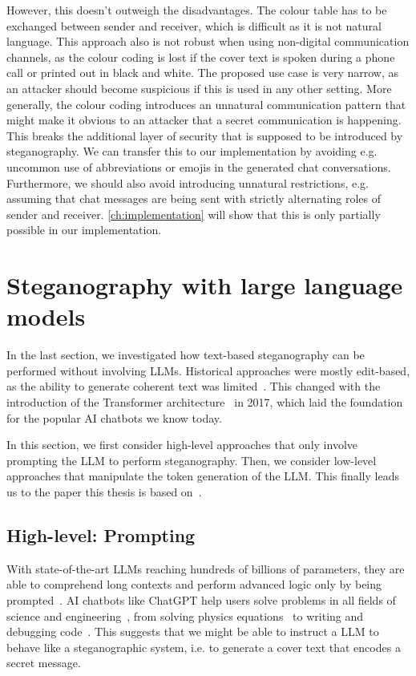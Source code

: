 However, this doesn't outweigh the disadvantages. The colour table has to be exchanged between sender and receiver, which is difficult as it is not natural language. This approach also is not robust when using non-digital communication channels, as the colour coding is lost if the cover text is spoken during a phone call or printed out in black and white. The proposed use case is very narrow, as an attacker should become suspicious if this is used in any other setting. More generally, the colour coding introduces an unnatural communication pattern that might make it obvious to an attacker that a secret communication is happening. This breaks the additional layer of security that is supposed to be introduced by steganography. We can transfer this to our implementation by avoiding e.g. uncommon use of abbreviations or emojis in the generated chat conversations. Furthermore, we should also avoid introducing unnatural restrictions, e.g. assuming that chat messages are being sent with strictly alternating roles of sender and receiver. \cref{ch:implementation} will show that this is only partially possible in our implementation.

\section{Steganography with large language models}
\label{sec:steganographyWithLLMs}
In the last section, we investigated how text-based steganography can be performed without involving \glspl{LLM}. Historical approaches were mostly edit-based, as the ability to generate coherent text was limited~\cite{zieglerNeuralLinguisticSteganography2019}. This changed with the introduction of the Transformer architecture~\cite{vaswaniAttentionAllYou2023} in 2017, which laid the foundation for the popular \gls{AI} chatbots we know today.

In this section, we first consider high-level approaches that only involve prompting the \gls{LLM} to perform steganography. Then, we consider low-level approaches that manipulate the token generation of the \gls{LLM}. This finally leads us to the paper this thesis is based on~\cite{zieglerNeuralLinguisticSteganography2019}.

\subsection{High-level: Prompting}
\label{sec:highLevelPrompting}
With state-of-the-art \glspl{LLM} reaching hundreds of billions of parameters, they are able to comprehend long contexts and perform advanced logic only by being prompted~\cite{hossainLLMProSAnalyzingLarge2025}. \gls{AI} chatbots like ChatGPT help users solve problems in all fields of science and engineering~\cite{schmidgallAgentLaboratoryUsing2025}, from solving physics equations~\cite{songLLMFeynmanLeveragingLarge2025,panQuantumManybodyPhysics2025} to writing and debugging code~\cite{leeGitHubRecentBugs2024,leeUnifiedDebuggingApproach2024,tianDebugBenchEvaluatingDebugging2024,shiCodeCorrectnessClosing2024}. This suggests that we might be able to instruct a \gls{LLM} to behave like a steganographic system, i.e. to generate a cover text that encodes a secret message.

